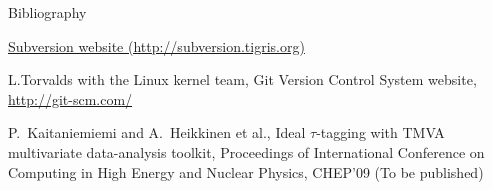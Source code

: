\documentclass[final,hyperref={pdfpagelabels=false},notitlepage=true]{beamer}
\begin{document}
\begin{frame}{}
\begin{columns}[t]
\begin{column}{0.45\linewidth}
\begin{block}{\large Bibliography}
\begin{thebibliography}{9}
\href{http://subversion.tigris.org}{Subversion website (http://subversion.tigris.org)}

L.Torvalds with the Linux kernel team,
Git Version Control System website,
\href{http://git-scm.com/}{http://git-scm.com/}


P.~Kaitaniemiemi and A.~Heikkinen et al.,
Ideal $\tau$-tagging with TMVA multivariate data-analysis toolkit,
Proceedings of International Conference on 
Computing in High Energy and Nuclear Physics, CHEP'09
(To be published)

\end{thebibliography}
\end{block}
    \vfill
    \end{column}
    \end{columns}
  \end{frame}
\end{document}
